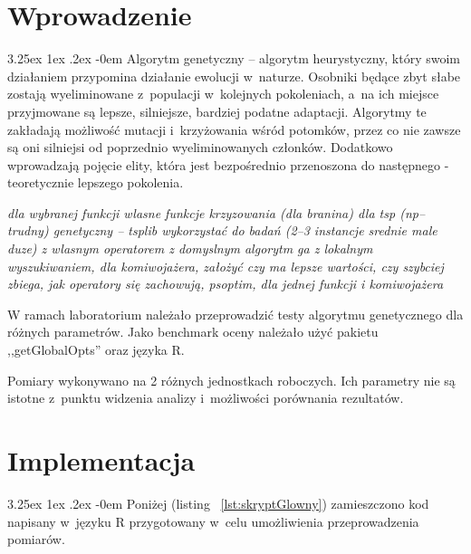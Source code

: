 \documentclass[11pt, a4paper]{article}
\date{\today}
\makeatletter
\newcommand{\fbi}{\leavevmode{\parindent=1em\indent}}
\renewcommand\paragraph{\@startsection{paragraph}{5}{\z@}
  {3.25ex \@plus1ex \@minus.2ex}
  {-0em}
  {\normalfont\normalsize\bfseries}}
\makeatother
\begin{document}


\tableofcontents

\newpage
\section{Wprowadzenie}
\paragraph{}
Algorytm genetyczny – algorytm heurystyczny, który swoim działaniem przypomina działanie ewolucji w~naturze. Osobniki będące zbyt słabe zostają wyeliminowane z~populacji w~kolejnych pokoleniach, a~na ich miejsce przyjmowane są lepsze, silniejsze, bardziej podatne adaptacji. Algorytmy te zakładają możliwość mutacji i~krzyżowania wśród potomków, przez co nie zawsze są oni silniejsi od poprzednio wyeliminowanych członków. Dodatkowo wprowadzają pojęcie elity, która jest bezpośrednio przenoszona do następnego - teoretycznie lepszego pokolenia.



\textit{dla wybranej funkcji wlasne funkcje krzyzowania (dla branina)
dla tsp (np--trudny) genetyczny -- tsplib wykorzystać do badań (2--3 instancje srednie male duze) z wlasnym operatorem z domyslnym
algorytm ga z lokalnym wyszukiwaniem, dla komiwojażera, założyć czy ma lepsze wartości, czy szybciej zbiega, jak operatory się zachowują,
psoptim, dla jednej funkcji i komiwojażera}



\fbi
W ramach laboratorium należało przeprowadzić testy algorytmu genetycznego dla różnych parametrów. Jako benchmark oceny należało użyć pakietu ,,getGlobalOpts'' oraz języka R.

\fbi
Pomiary wykonywano na 2 różnych jednostkach roboczych. Ich parametry nie są istotne z~punktu widzenia analizy i~możliwości porównania rezultatów.

\section{Implementacja}
\paragraph{}
Poniżej (listing ~\ref{lst:skryptGlowny}) zamieszczono kod napisany w~języku R przygotowany w~celu umożliwienia przeprowadzenia pomiarów.


\end{document}
